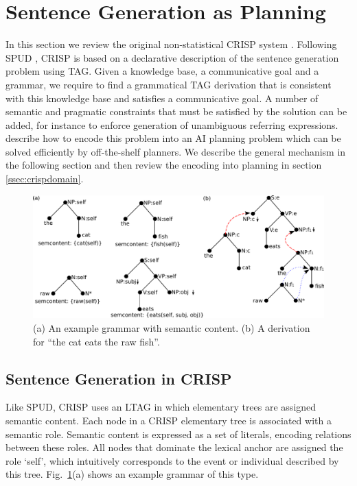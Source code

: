 \section{Sentence Generation as Planning}
\label{sec:crisp}
In this section we review the original non-statistical CRISP system \cite{kollerstone2007}. 
Following SPUD \cite{Stone2003a}, CRISP is based on a declarative description of the sentence generation problem using TAG. Given a knowledge base, a communicative goal and a grammar, we require to find a grammatical TAG derivation that is consistent with this knowledge base and satisfies a communicative goal. A number of semantic and pragmatic constraints that must be satisfied by the solution can be added, for instance to enforce generation of unambiguous referring expressions.  describe how to encode this problem into an AI planning problem which can be solved efficiently by off-the-shelf planners. We describe the general mechanism in the following section and then review the encoding into planning in section \ref{ssec:crispdomain}. 
\begin{figure}[th]
\begin{center}
\includegraphics[width=.8\textwidth]{figures/grammar.pdf}
\caption{\label{fig:grammar}(a) An example grammar with semantic content. (b) A derivation for ``the cat eats the raw fish''. }
\end{center}
\end{figure}

\subsection{Sentence Generation in CRISP}
Like SPUD, CRISP uses an LTAG in which elementary trees are assigned semantic content. Each node in a CRISP elementary tree is associated with a semantic role. Semantic content is expressed as a set of literals, encoding relations between these roles. All nodes that dominate the lexical anchor are assigned the role `self', which intuitively corresponds to the event or individual described by this tree. Fig.~\ref{fig:grammar}(a) shows an example grammar of this type. 

